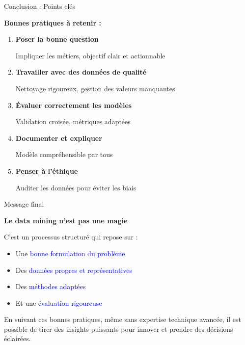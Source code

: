 \begin{frame}{Conclusion : Points clés}

\textbf{Bonnes pratiques à retenir :}

\vspace{0.3cm}

\begin{enumerate}
    \item \textbf{Poser la bonne question}

    Impliquer les métiers, objectif clair et actionnable

    \item \textbf{Travailler avec des données de qualité}
    
    Nettoyage rigoureux, gestion des valeurs manquantes

    \item \textbf{Évaluer correctement les modèles}
    
    Validation croisée, métriques adaptées

    \item \textbf{Documenter et expliquer}
    
    Modèle compréhensible par tous

    \item \textbf{Penser à l'éthique}
    
    Auditer les données pour éviter les biais

\end{enumerate}

\end{frame}

\begin{frame}{Message final}

\textbf{Le data mining n'est pas une magie}

\vspace{0.3cm}

C'est un processus structuré qui repose sur :

\vspace{0.3cm}

\begin{itemize}
    \item Une \textcolor{blue}{bonne formulation du problème}
    \item Des \textcolor{blue}{données propres et représentatives}
    \item Des \textcolor{blue}{méthodes adaptées}
    \item Et une \textcolor{blue}{évaluation rigoureuse}
\end{itemize}

\vspace{0.5cm}

En suivant ces bonnes pratiques, même sans expertise technique avancée, il est possible de tirer des insights puissants pour innover et prendre des décisions éclairées.

\end{frame}
